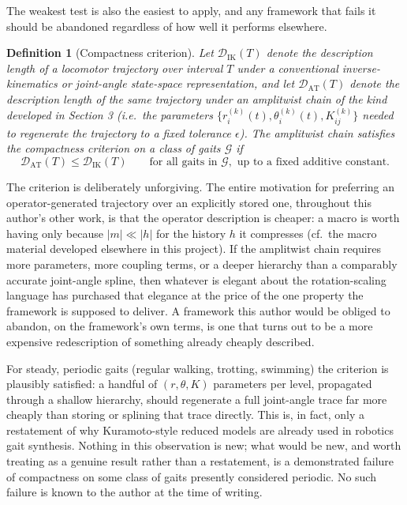\documentclass[12pt]{article}
\newtheorem{definition}{Definition}
\begin{document}
The weakest test is also the easiest to apply, and any framework that fails it should be abandoned regardless of how well it performs elsewhere.

\begin{definition}[Compactness criterion]
Let $\mathcal{D}_{\mathrm{IK}}(T)$ denote the description length of a locomotor trajectory over interval $T$ under a conventional inverse-kinematics or joint-angle state-space representation, and let $\mathcal{D}_{\mathrm{AT}}(T)$ denote the description length of the same trajectory under an amplitwist chain of the kind developed in Section 3 (i.e.\ the parameters $\{r_i^{(k)}(t), \theta_i^{(k)}(t), K_{ij}^{(k)}\}$ needed to regenerate the trajectory to a fixed tolerance $\epsilon$). The amplitwist chain satisfies the \emph{compactness criterion} on a class of gaits $\mathcal{G}$ if
\[
\mathcal{D}_{\mathrm{AT}}(T) \le \mathcal{D}_{\mathrm{IK}}(T) \qquad \text{for all gaits in } \mathcal{G}, \text{ up to a fixed additive constant.}
\]
\end{definition}

The criterion is deliberately unforgiving. The entire motivation for preferring an operator-generated trajectory over an explicitly stored one, throughout this author's other work, is that the operator description is cheaper: a macro is worth having only because $|m| \ll |h|$ for the history $h$ it compresses (cf.\ the macro material developed elsewhere in this project). If the amplitwist chain requires more parameters, more coupling terms, or a deeper hierarchy than a comparably accurate joint-angle spline, then whatever is elegant about the rotation-scaling language has purchased that elegance at the price of the one property the framework is supposed to deliver. A framework this author would be obliged to abandon, on the framework's own terms, is one that turns out to be a more expensive redescription of something already cheaply described.

For steady, periodic gaits (regular walking, trotting, swimming) the criterion is plausibly satisfied: a handful of $(r,\theta,K)$ parameters per level, propagated through a shallow hierarchy, should regenerate a full joint-angle trace far more cheaply than storing or splining that trace directly. This is, in fact, only a restatement of why Kuramoto-style reduced models are already used in robotics gait synthesis. Nothing in this observation is new; what would be new, and worth treating as a genuine result rather than a restatement, is a demonstrated failure of compactness on some class of gaits presently considered periodic. No such failure is known to the author at the time of writing.
\end{document}
